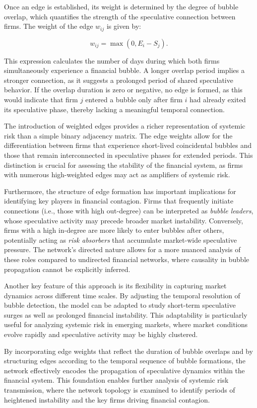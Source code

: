 \documentclass[preprint,12pt,authoryear]{elsarticle}
\begin{document}
Once an edge is established, its weight is determined by the degree of bubble overlap, which quantifies the strength of the speculative connection between firms. The weight of the edge \( w_{ij} \) is given by:

\[
w_{ij} = \max(0, E_i - S_j).
\]

This expression calculates the number of days during which both firms simultaneously experience a financial bubble. A longer overlap period implies a stronger connection, as it suggests a prolonged period of shared speculative behavior. If the overlap duration is zero or negative, no edge is formed, as this would indicate that firm \( j \) entered a bubble only after firm \( i \) had already exited its speculative phase, thereby lacking a meaningful temporal connection.

The introduction of weighted edges provides a richer representation of systemic risk than a simple binary adjacency matrix. The edge weights allow for the differentiation between firms that experience short-lived coincidental bubbles and those that remain interconnected in speculative phases for extended periods. This distinction is crucial for assessing the stability of the financial system, as firms with numerous high-weighted edges may act as amplifiers of systemic risk.

Furthermore, the structure of edge formation has important implications for identifying key players in financial contagion. Firms that frequently initiate connections (i.e., those with high out-degree) can be interpreted as \textit{bubble leaders}, whose speculative activity may precede broader market instability. Conversely, firms with a high in-degree are more likely to enter bubbles after others, potentially acting as \textit{risk absorbers} that accumulate market-wide speculative pressure. The network’s directed nature allows for a more nuanced analysis of these roles compared to undirected financial networks, where causality in bubble propagation cannot be explicitly inferred.

Another key feature of this approach is its flexibility in capturing market dynamics across different time scales. By adjusting the temporal resolution of bubble detection, the model can be adapted to study short-term speculative surges as well as prolonged financial instability. This adaptability is particularly useful for analyzing systemic risk in emerging markets, where market conditions evolve rapidly and speculative activity may be highly clustered.

By incorporating edge weights that reflect the duration of bubble overlaps and by structuring edges according to the temporal sequence of bubble formations, the network effectively encodes the propagation of speculative dynamics within the financial system. This foundation enables further analysis of systemic risk transmission, where the network topology is examined to identify periods of heightened instability and the key firms driving financial contagion.
\end{document}
